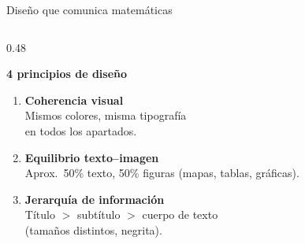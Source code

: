 \documentclass[aspectratio=169, 10pt, spanish]{beamer}
\begin{document}
\begin{frame}{Diseño que comunica matemáticas}
  \begin{columns}[T]
    \begin{column}{0.48\textwidth}
      \begin{teoriabox}
        \textbf{4 principios de diseño}
        \begin{enumerate}
          \item \textbf{Coherencia visual}\\
            Mismos colores, misma tipografía\\
            en todos los apartados.

          \item \textbf{Equilibrio texto--imagen}\\
            Aprox.\ 50\% texto, 50\% figuras
            (mapas, tablas, gráficas).

          \item \textbf{Jerarquía de información}\\
            Título $>$ subtítulo $>$ cuerpo de texto\\
            (tamaños distintos, negrita).


\end{enumerate}
\end{teoriabox}
\end{column}
\end{columns}
\end{frame}
\end{document}
